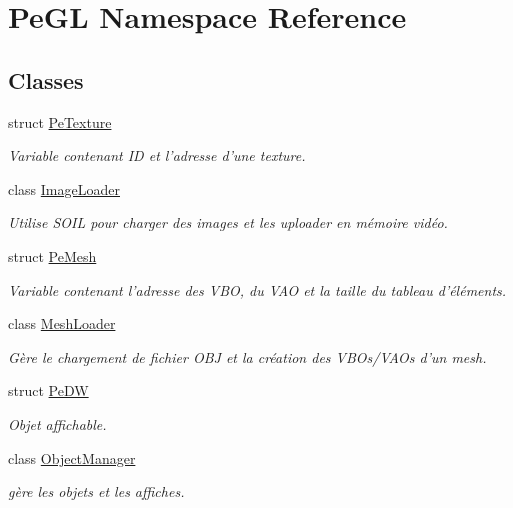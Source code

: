 \hypertarget{namespacePeGL}{\section{Pe\-G\-L Namespace Reference}
\label{namespacePeGL}
}
\subsection*{Classes}
\begin{DoxyCompactItemize}
\item 
struct \hyperlink{structPeGL_1_1PeTexture}{Pe\-Texture}
\begin{DoxyCompactList}\small\item\em Variable contenant I\-D et l'adresse d'une texture. \end{DoxyCompactList}\item 
class \hyperlink{classPeGL_1_1ImageLoader}{Image\-Loader}
\begin{DoxyCompactList}\small\item\em Utilise S\-O\-I\-L pour charger des images et les uploader en mémoire vidéo. \end{DoxyCompactList}\item 
struct \hyperlink{structPeGL_1_1PeMesh}{Pe\-Mesh}
\begin{DoxyCompactList}\small\item\em Variable contenant l'adresse des V\-B\-O, du V\-A\-O et la taille du tableau d'éléments. \end{DoxyCompactList}\item 
class \hyperlink{classPeGL_1_1MeshLoader}{Mesh\-Loader}
\begin{DoxyCompactList}\small\item\em Gère le chargement de fichier O\-B\-J et la création des V\-B\-Os/\-V\-A\-Os d'un mesh. \end{DoxyCompactList}\item 
struct \hyperlink{structPeGL_1_1PeDW}{Pe\-D\-W}
\begin{DoxyCompactList}\small\item\em Objet affichable. \end{DoxyCompactList}\item 
class \hyperlink{classPeGL_1_1ObjectManager}{Object\-Manager}
\begin{DoxyCompactList}\small\item\em gère les objets et les affiches. \end{DoxyCompactList}\item 

\end{DoxyCompactItemize}
